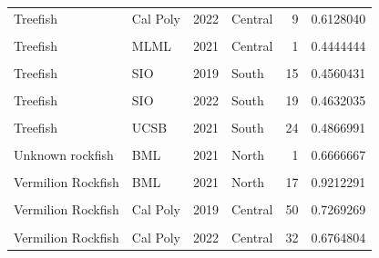 \documentclass[
]{article}
\begin{document}
\begin{longtable}[t]{llrlrr}
Treefish & Cal Poly & 2022 & Central & 9 & 0.6128040\\
\addlinespace
\cellcolor{gray!6}{Treefish} & \cellcolor{gray!6}{MLML} & \cellcolor{gray!6}{2019} & \cellcolor{gray!6}{Central} & \cellcolor{gray!6}{4} & \cellcolor{gray!6}{0.4119875}\\
Treefish & MLML & 2021 & Central & 1 & 0.4444444\\
\cellcolor{gray!6}{Treefish} & \cellcolor{gray!6}{MLML} & \cellcolor{gray!6}{2022} & \cellcolor{gray!6}{Central} & \cellcolor{gray!6}{9} & \cellcolor{gray!6}{0.4898393}\\
Treefish & SIO & 2019 & South & 15 & 0.4560431\\
\cellcolor{gray!6}{Treefish} & \cellcolor{gray!6}{SIO} & \cellcolor{gray!6}{2021} & \cellcolor{gray!6}{South} & \cellcolor{gray!6}{3} & \cellcolor{gray!6}{0.6919192}\\
\addlinespace
Treefish & SIO & 2022 & South & 19 & 0.4632035\\
\cellcolor{gray!6}{Treefish} & \cellcolor{gray!6}{UCSB} & \cellcolor{gray!6}{2019} & \cellcolor{gray!6}{South} & \cellcolor{gray!6}{19} & \cellcolor{gray!6}{0.7521898}\\
Treefish & UCSB & 2021 & South & 24 & 0.4866991\\
\cellcolor{gray!6}{Treefish} & \cellcolor{gray!6}{UCSB} & \cellcolor{gray!6}{2022} & \cellcolor{gray!6}{South} & \cellcolor{gray!6}{37} & \cellcolor{gray!6}{0.5817959}\\
Unknown rockfish & BML & 2021 & North & 1 & 0.6666667\\
\addlinespace
\cellcolor{gray!6}{Vermilion Rockfish} & \cellcolor{gray!6}{BML} & \cellcolor{gray!6}{2019} & \cellcolor{gray!6}{North} & \cellcolor{gray!6}{28} & \cellcolor{gray!6}{1.1399823}\\
Vermilion Rockfish & BML & 2021 & North & 17 & 0.9212291\\
\cellcolor{gray!6}{Vermilion Rockfish} & \cellcolor{gray!6}{BML} & \cellcolor{gray!6}{2022} & \cellcolor{gray!6}{North} & \cellcolor{gray!6}{19} & \cellcolor{gray!6}{0.7731985}\\
Vermilion Rockfish & Cal Poly & 2019 & Central & 50 & 0.7269269\\
\cellcolor{gray!6}{Vermilion Rockfish} & \cellcolor{gray!6}{Cal Poly} & \cellcolor{gray!6}{2021} & \cellcolor{gray!6}{Central} & \cellcolor{gray!6}{27} & \cellcolor{gray!6}{0.9468120}\\
\addlinespace
Vermilion Rockfish & Cal Poly & 2022 & Central & 32 & 0.6764804\\

\end{longtable}
\end{document}
